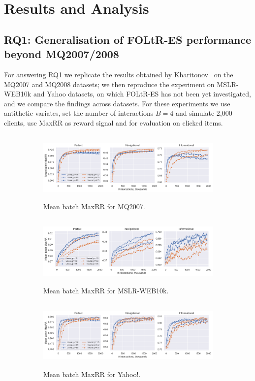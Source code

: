 \section{Results and Analysis}

\subsection{RQ1: Generalisation of FOLtR-ES performance beyond MQ2007/2008}
For answering RQ1 we replicate the results obtained by Kharitonov~\cite{kharitonov2019federated} on the MQ2007 and MQ2008 datasets; we then reproduce the experiment on MSLR-WEB10k and Yahoo datasets, on which FOLtR-ES has not been yet investigated, and we compare the findings across datasets. For these experiments we use antithetic variates, set the number of interactions $B = 4$ and simulate 2,000 clients, use MaxRR as reward signal and for evaluation on clicked items. 

\begin{figure}[t]
	\centering
	\begin{subfigure}{1\textwidth}
		\includegraphics[width=13cm, height=3.5cm]{images/RQ1/mq2007_foltr_c2000_ps.png}
		\caption{Mean batch MaxRR for MQ2007.}
		\label{fig:mq2007-rq1}
	\end{subfigure}
	\begin{subfigure}{1\textwidth}
		\includegraphics[width=13cm, height=3.5cm]{images/RQ1/mslr10k_foltr_c2000_ps.png}
		\caption{Mean batch MaxRR for MSLR-WEB10k.}
		\label{fig:mslr10k-rq1}
	\end{subfigure}
	\begin{subfigure}{1\textwidth}
		\includegraphics[width=13cm, height=3.5cm]{images/RQ1/yahoo_foltr_c2000_ps.png}
		\caption{Mean batch MaxRR for Yahoo!.}
		\label{fig:yahoo-rq1}
	\end{subfigure}
	\caption{{\color{red}{Results for RQ1: performance of FOLtR-ES across datasets under three different click models (averaged across all dataset splits).}} \label{fig:RQ1}}
\end{figure}

